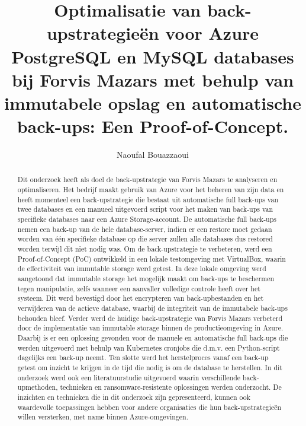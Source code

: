 \documentclass[a0,portrait]{hogent-poster}
\title{Optimalisatie van back-upstrategieën voor Azure PostgreSQL en MySQL databases bij Forvis Mazars met behulp van immutabele opslag en automatische back-ups: Een Proof-of-Concept.}
\author{Naoufal Bouazzaoui}
\begin{document}
\maketitle

\begin{abstract}
Dit onderzoek heeft als doel de back-upstrategie van Forvis Mazars te analyseren en optimaliseren. Het bedrijf maakt gebruik van Azure voor het beheren van zijn data en heeft momenteel een back-upstrategie die bestaat uit automatische full back-ups van twee databases en een manueel uitgevoerd script voor het maken van back-ups van specifieke databases naar een Azure Storage-account. De automatische full back-ups nemen een back-up van de hele database-server, indien er een restore moet gedaan worden van één specifieke database op die server zullen alle databases dus restored worden terwijl dit niet nodig was. Om de back-upstrategie te verbeteren, werd een Proof-of-Concept (PoC) ontwikkeld in een lokale testomgeving met VirtualBox, waarin de effectiviteit van immutable storage werd getest. In deze lokale omgeving werd aangetoond dat immutable storage het mogelijk maakt om back-ups te beschermen tegen manipulatie, zelfs wanneer een aanvaller volledige controle heeft over het systeem. Dit werd bevestigd door het encrypteren van back-upbestanden en het verwijderen van de actieve database, waarbij de integriteit van de immutabele back-ups behouden bleef. Verder werd de huidige back-upstrategie van Forvis Mazars verbeterd door de implementatie van immutable storage binnen de productieomgeving in Azure. Daarbij is er een oplossing gevonden voor de manuele en automatische full back-ups die werden uitgevoerd met behulp van Kubernetes cronjobs die d.m.v. een Python-script dagelijks een back-up neemt. Ten slotte werd het herstelproces vanaf een back-up getest om inzicht te krijgen in de tijd die nodig is om de database te herstellen. In dit onderzoek werd ook een literatuurstudie uitgevoerd waarin verschillende back-upmethoden, technieken en ransomware-resistente oplossingen werden onderzocht. De inzichten en technieken die in dit onderzoek zijn gepresenteerd, kunnen ook waardevolle toepassingen hebben voor andere organisaties die hun back-upstrategieën willen versterken, met name binnen Azure-omgevingen.
\end{abstract}
\end{document}
